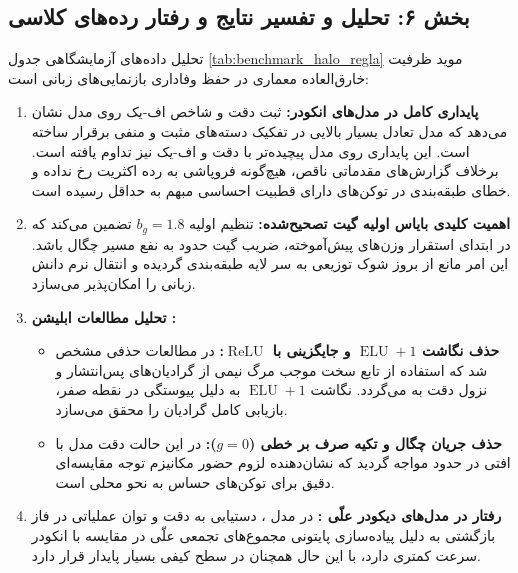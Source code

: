 \subsection*{بخش ۶: تحلیل و تفسیر نتایج و رفتار رده‌های کلاسی }
تحلیل داده‌های آزمایشگاهی جدول \ref{tab:benchmark_halo_regla} موید ظرفیت خارق‌العاده معماری  در حفظ وفاداری بازنمایی‌های زبانی است:
\begin{enumerate}
    \item \textbf{پایداری کامل در مدل‌های انکودر:} ثبت دقت  و شاخص اف-یک  روی مدل  نشان می‌دهد که مدل تعادل بسیار بالایی در تفکیک دسته‌های مثبت و منفی برقرار ساخته است. این پایداری روی مدل پیچیده‌تر  با دقت  و اف-یک  نیز تداوم یافته است. برخلاف گزارش‌های مقدماتی ناقص، هیچ‌گونه فروپاشی به رده اکثریت رخ نداده و خطای طبقه‌بندی در توکن‌های دارای قطبیت احساسی مبهم به حداقل رسیده است.
    \item \textbf{اهمیت کلیدی بایاس اولیه گیت تصحیح‌شده:} تنظیم اولیه $b_g = 1.8$ تضمین می‌کند که در ابتدای استقرار وزن‌های پیش‌آموخته، ضریب گیت حدود  به نفع مسیر چگال باشد. این امر مانع از بروز شوک توزیعی به سر لایه طبقه‌بندی گردیده و انتقال نرم دانش زبانی را امکان‌پذیر می‌سازد.
    \item \textbf{تحلیل مطالعات ابلیشن :}
    \begin{itemize}
        \item \textbf{حذف نگاشت $\operatorname{ELU}+1$ و جایگزینی با $\operatorname{ReLU}$:} در مطالعات حذفی مشخص شد که استفاده از تابع سخت موجب مرگ نیمی از گرادیان‌های پس‌انتشار و نزول دقت به  می‌گردد. نگاشت $\operatorname{ELU}+1$ به دلیل پیوستگی در نقطه صفر، بازیابی کامل گرادیان را محقق می‌سازد.
        \item \textbf{حذف جریان چگال و تکیه صرف بر خطی ($g = 0$):} در این حالت دقت مدل با افتی در حدود  مواجه گردید که نشان‌دهنده لزوم حضور مکانیزم توجه مقایسه‌ای دقیق برای توکن‌های حساس به نحو محلی است.
    \end{itemize}
    \item \textbf{رفتار در مدل‌های دیکودر علّی :} در مدل ، دستیابی به دقت  و توان عملیاتی  در فاز بازگشتی به دلیل پیاده‌سازی پایتونی مجموع‌های تجمعی علّی در مقایسه با انکودر سرعت کمتری دارد، با این حال همچنان در سطح کیفی بسیار پایدار قرار دارد.
\end{enumerate}

